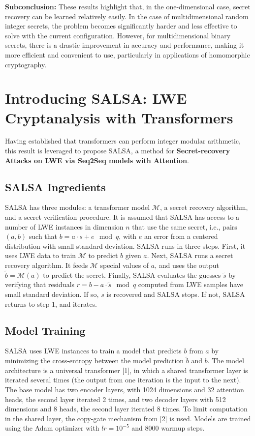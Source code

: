 \documentclass{article}
\begin{document}
\textbf{Subconclusion:} These results highlight that, in the one-dimensional case, secret recovery can be learned relatively easily. In the case of multidimensional random integer secrets, the problem becomes significantly harder and less effective to solve with the current configuration. However, for multidimensional binary secrets, there is a drastic improvement in accuracy and performance, making it more efficient and convenient to use, particularly in applications of homomorphic cryptography.

\section{Introducing SALSA: LWE Cryptanalysis with Transformers}

Having established that transformers can perform integer modular arithmetic, this result is leveraged to propose SALSA, a method for \textbf{Secret-recovery Attacks on LWE via Seq2Seq models with Attention}.

\subsection{SALSA Ingredients}
SALSA has three modules: a transformer model \( \mathcal{M} \), a secret recovery algorithm, and a secret verification procedure. It is assumed that SALSA has access to a number of LWE instances in dimension \( n \) that use the same secret, i.e., pairs \((a, b)\) such that \( b = a \cdot s + e \mod q \), with \( e \) an error from a centered distribution with small standard deviation. SALSA runs in three steps. First, it uses LWE data to train \( \mathcal{M} \) to predict \( b \) given \( a \). Next, SALSA runs a secret recovery algorithm. It feeds \( \mathcal{M} \) special values of \( a \), and uses the output \( \tilde{b} = \mathcal{M}(a) \) to predict the secret. Finally, SALSA evaluates the guesses \( \tilde{s} \) by verifying that residuals \( r = b - a \cdot \tilde{s} \mod q \) computed from LWE samples have small standard deviation. If so, \( s \) is recovered and SALSA stops. If not, SALSA returns to step 1, and iterates.

\subsection{Model Training}
SALSA uses LWE instances to train a model that predicts \( b \) from \( a \) by minimizing the cross-entropy between the model prediction \( \tilde{b} \) and \( b \). The model architecture is a universal transformer [1], in which a shared transformer layer is iterated several times (the output from one iteration is the input to the next). The base model has two encoder layers, with 1024 dimensions and 32 attention heads, the second layer iterated 2 times, and two decoder layers with 512 dimensions and 8 heads, the second layer iterated 8 times. To limit computation in the shared layer, the copy-gate mechanism from [2] is used. Models are trained using the Adam optimizer with \( lr = 10^{-5} \) and 8000 warmup steps.
\end{document}
